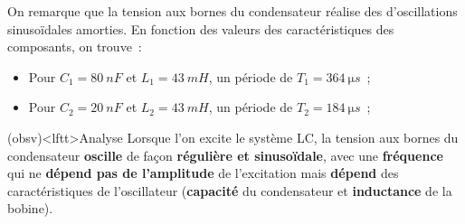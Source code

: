\documentclass[../../main/main.tex]{subfiles}
\begin{document}
\begin{minipage}{0.50\linewidth}
	\begin{center}
	\end{center}
\end{minipage}
On remarque que la tension aux bornes du condensateur réalise des
d'oscillations sinusoïdales amorties. En fonction des valeurs des
caractéristiques des composants, on trouve~:
\begin{itemize}
	\item Pour $C_1 = \SI{80}{nF}$ et $L_1 = \SI{43}{mH}$, un période de $T_1 =
		      \SI{364}{\micro s}$~;
	\item Pour $C_2 = \SI{20}{nF}$ et $L_2 = \SI{43}{mH}$, un période de $T_2 =
		      \SI{184}{\micro s}$~;
\end{itemize}

\begin{tcn}(obsv)<lftt>{Analyse}
	Lorsque l'on excite le système LC, la tension aux bornes du condensateur
	\textbf{oscille} de façon \textbf{régulière et sinusoïdale}, avec une
	\textbf{fréquence} qui ne \textbf{dépend pas de l'amplitude} de l'excitation
	mais \textbf{dépend} des caractéristiques de l'oscillateur (\textbf{capacité}
	du condensateur et \textbf{inductance} de la bobine).
\end{tcn}
\end{document}
